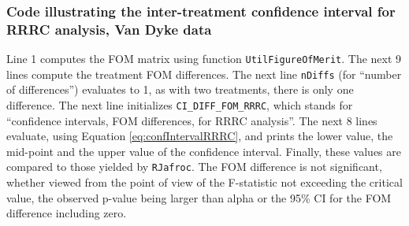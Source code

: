 \documentclass[
]{book}
\begin{document}
\hypertarget{code-illustrating-the-inter-treatment-confidence-interval-for-rrrc-analysis-van-dyke-data}{%
\subsubsection{Code illustrating the inter-treatment confidence interval for RRRC analysis, Van Dyke data}\label{code-illustrating-the-inter-treatment-confidence-interval-for-rrrc-analysis-van-dyke-data}}

Line 1 computes the FOM matrix using function \texttt{UtilFigureOfMerit}. The next 9 lines compute the treatment FOM differences. The next line \texttt{nDiffs} (for ``number of differences'') evaluates to 1, as with two treatments, there is only one difference. The next line initializes \texttt{CI\_DIFF\_FOM\_RRRC}, which stands for ``confidence intervals, FOM differences, for RRRC analysis''. The next 8 lines evaluate, using Equation \eqref{eq:confIntervalRRRC}, and prints the lower value, the mid-point and the upper value of the confidence interval. Finally, these values are compared to those yielded by \texttt{RJafroc}. The FOM difference is not significant, whether viewed from the point of view of the F-statistic not exceeding the critical value, the observed p-value being larger than alpha or the 95\% CI for the FOM difference including zero.
\end{document}
